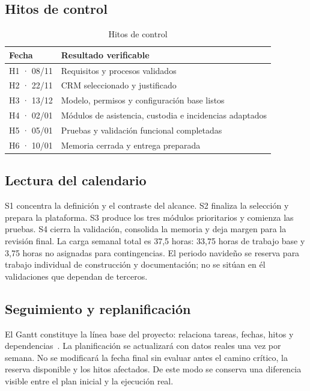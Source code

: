 \subsection{Hitos de control}\label{sec:2-3-1}

\begin{table}[H]
\centering\small
\begin{tabularx}{\textwidth}{>{\hsize=0.525\hsize\raggedright\arraybackslash}X>{\hsize=1.475\hsize\raggedright\arraybackslash}X}
\toprule
\rowcolor{cabeceratabla} \textbf{Fecha} & \textbf{Resultado verificable} \\
\midrule
H1 · 08/11 & Requisitos y procesos validados \\
H2 · 22/11 & CRM seleccionado y justificado \\
H3 · 13/12 & Modelo, permisos y configuración base listos \\
H4 · 02/01 & Módulos de asistencia, custodia e incidencias adaptados \\
H5 · 05/01 & Pruebas y validación funcional completadas \\
H6 · 10/01 & Memoria cerrada y entrega preparada \\
\bottomrule
\end{tabularx}
\caption{Hitos de control}\label{tab:11}
\end{table}

\subsection{Lectura del calendario}\label{sec:2-3-2}

S1 concentra la definición y el contraste del alcance. S2 finaliza la selección y prepara la plataforma. S3 produce los tres módulos prioritarios y comienza las pruebas. S4 cierra la validación, consolida la memoria y deja margen para la revisión final. La carga semanal total es 37,5 horas: 33,75 horas de trabajo base y 3,75 horas no asignadas para contingencias. El periodo navideño se reserva para trabajo individual de construcción y documentación; no se sitúan en él validaciones que dependan de terceros.

\subsection{Seguimiento y replanificación}\label{sec:2-3-3}

El Gantt constituye la línea base del proyecto: relaciona tareas, fechas, hitos y dependencias~\cite{ref16,ref17}. La planificación se actualizará con datos reales una vez por semana. No se modificará la fecha final sin evaluar antes el camino crítico, la reserva disponible y los hitos afectados. De este modo se conserva una diferencia visible entre el plan inicial y la ejecución real.


